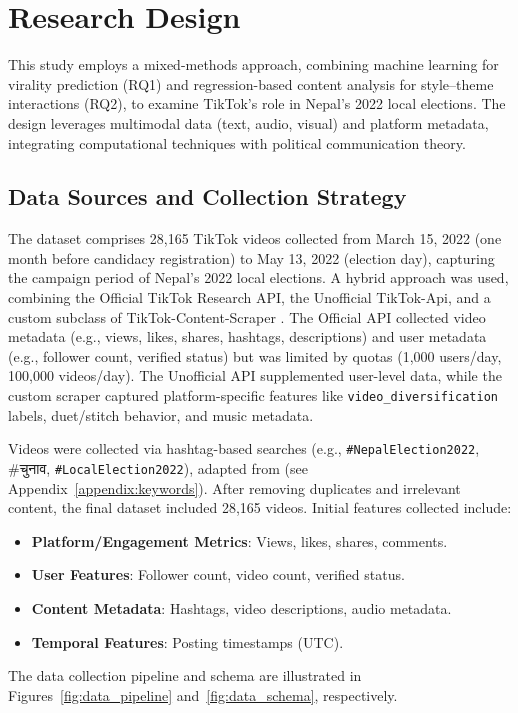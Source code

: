 \documentclass[12pt,a4paper]{report}
\begin{document}
\chapter{Research Design}
This study employs a mixed-methods approach, combining machine learning for virality prediction (RQ1) and regression-based content analysis for style–theme interactions (RQ2), to examine TikTok’s role in Nepal’s 2022 local elections. The design leverages multimodal data (text, audio, visual) and platform metadata, integrating computational techniques with political communication theory.

\section{Data Sources and Collection Strategy}
The dataset comprises 28,165 TikTok videos collected from March 15, 2022 (one month before candidacy registration) to May 13, 2022 (election day), capturing the campaign period of Nepal’s 2022 local elections. A hybrid approach was used, combining the Official TikTok Research API, the Unofficial TikTok-Api, and a custom subclass of TikTok-Content-Scraper \parencite{QBukold2025TikTokScraper}. The Official API collected video metadata (e.g., views, likes, shares, hashtags, descriptions) and user metadata (e.g., follower count, verified status) but was limited by quotas (1,000 users/day, 100,000 videos/day). The Unofficial API supplemented user-level data, while the custom scraper captured platform-specific features like \texttt{video\_diversification} labels, duet/stitch behavior, and music metadata.

Videos were collected via hashtag-based searches (e.g., \texttt{\#NepalElection2022}, \texthindi{\#चुनाव}, \texttt{\#LocalElection2022}), adapted from \parencite{pinto2024} (see Appendix~\ref{appendix:keywords}). After removing duplicates and irrelevant content, the final dataset included 28,165 videos. Initial features collected include:
\begin{itemize}
    \item \textbf{Platform/Engagement Metrics}: Views, likes, shares, comments.
    \item \textbf{User Features}: Follower count, video count, verified status.
    \item \textbf{Content Metadata}: Hashtags, video descriptions, audio metadata.
    \item \textbf{Temporal Features}: Posting timestamps (UTC).
\end{itemize}
The data collection pipeline and schema are illustrated in Figures~\ref{fig:data_pipeline} and~\ref{fig:data_schema}, respectively.
\end{document}
